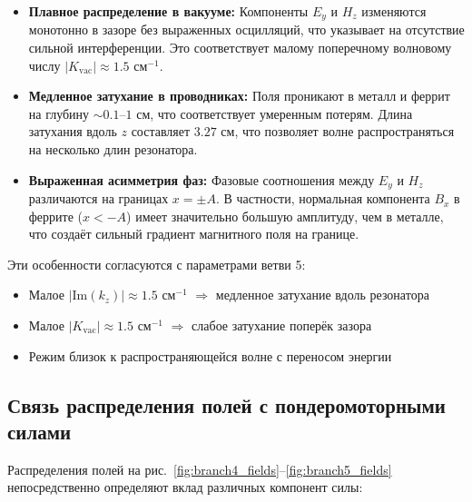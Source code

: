 \documentclass[a4paper,12pt]{article}
\begin{document}
\begin{itemize}
    \item \textbf{Плавное распределение в вакууме:} Компоненты $E_y$ и $H_z$
    изменяются монотонно в зазоре без выраженных осцилляций, что указывает на
    отсутствие сильной интерференции. Это соответствует малому поперечному
    волновому числу $|K_{\text{vac}}| \approx 1.5$ см$^{-1}$.

    \item \textbf{Медленное затухание в проводниках:} Поля проникают в металл
    и феррит на глубину $\sim 0.1$--$1$ см, что соответствует умеренным потерям.
    Длина затухания вдоль $z$ составляет $3.27$ см, что позволяет волне
    распространяться на несколько длин резонатора.

    \item \textbf{Выраженная асимметрия фаз:} Фазовые соотношения между
    $E_y$ и $H_z$ различаются на границах $x = \pm A$. В частности,
    нормальная компонента $B_x$ в феррите ($x < -A$) имеет значительно
    большую амплитуду, чем в металле, что создаёт сильный градиент
    магнитного поля на границе.
\end{itemize}

Эти особенности согласуются с параметрами ветви 5:
\begin{itemize}
    \item Малое $|\text{Im}(k_z)| \approx 1.5$ см$^{-1}$ $\Rightarrow$ медленное
    затухание вдоль резонатора
    \item Малое $|K_{\text{vac}}| \approx 1.5$ см$^{-1}$ $\Rightarrow$ слабое
    затухание поперёк зазора
    \item Режим близок к распространяющейся волне с переносом энергии
\end{itemize}

\subsection{Связь распределения полей с пондеромоторными силами}

Распределения полей на рис.~\ref{fig:branch4_fields}--\ref{fig:branch5_fields}
непосредственно определяют вклад различных компонент силы:
\end{document}
